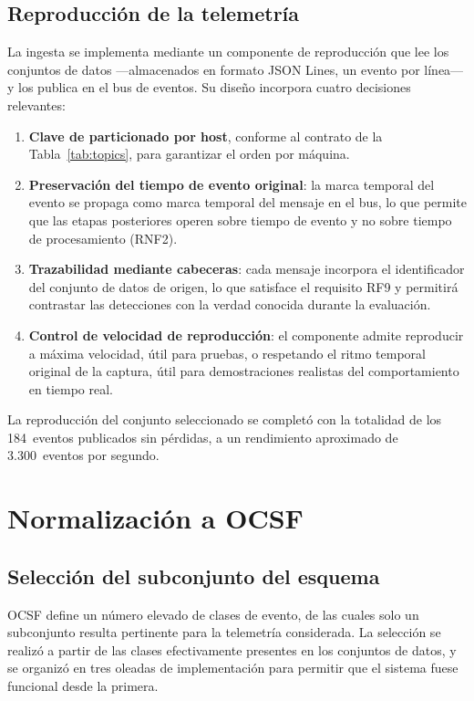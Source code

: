 \subsection{Reproducción de la telemetría}

La ingesta se implementa mediante un componente de reproducción que lee los conjuntos de
datos —almacenados en formato JSON Lines, un evento por línea— y los publica en el bus de
eventos. Su diseño incorpora cuatro decisiones relevantes:

\begin{enumerate}
    \item \textbf{Clave de particionado por host}, conforme al contrato de la
    Tabla~\ref{tab:topics}, para garantizar el orden por máquina.
    \item \textbf{Preservación del tiempo de evento original}: la marca temporal del evento
    se propaga como marca temporal del mensaje en el bus, lo que permite que las etapas
    posteriores operen sobre tiempo de evento y no sobre tiempo de procesamiento (RNF2).
    \item \textbf{Trazabilidad mediante cabeceras}: cada mensaje incorpora el identificador
    del conjunto de datos de origen, lo que satisface el requisito RF9 y permitirá contrastar
    las detecciones con la verdad conocida durante la evaluación.
    \item \textbf{Control de velocidad de reproducción}: el componente admite reproducir a
    máxima velocidad, útil para pruebas, o respetando el ritmo temporal original de la
    captura, útil para demostraciones realistas del comportamiento en tiempo real.
\end{enumerate}

La reproducción del conjunto seleccionado se completó con la totalidad de los 184~eventos
publicados sin pérdidas, a un rendimiento aproximado de 3.300~eventos por segundo.

\section{Normalización a OCSF}

\subsection{Selección del subconjunto del esquema}

OCSF define un número elevado de clases de evento, de las cuales solo un subconjunto resulta
pertinente para la telemetría considerada. La selección se realizó a partir de las clases
efectivamente presentes en los conjuntos de datos, y se organizó en tres oleadas de
implementación para permitir que el sistema fuese funcional desde la primera.

